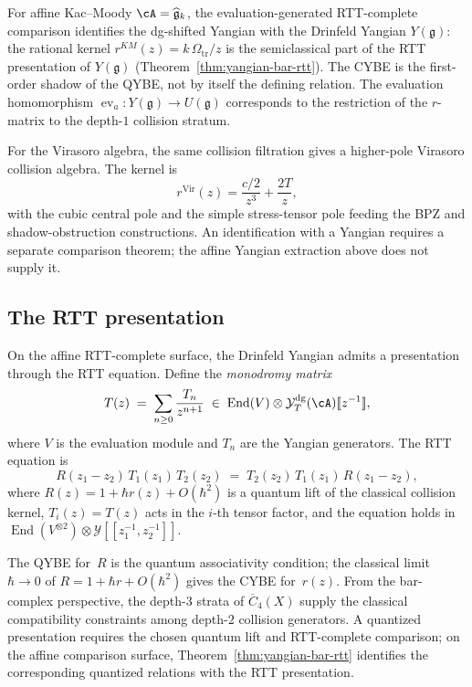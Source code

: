 For affine Kac--Moody $\cA = \widehat{\mathfrak{g}}_k$, the
evaluation-generated RTT-complete comparison identifies the
dg-shifted Yangian with the Drinfeld Yangian $Y(\mathfrak{g})$: the
rational kernel $r^{KM}(z) = k\,\Omega_{\mathrm{tr}}/z$ is the semiclassical part
of the RTT presentation of $Y(\mathfrak{g})$
(Theorem~\ref{thm:yangian-bar-rtt}). The CYBE is the first-order
shadow of the QYBE, not by itself the defining relation. The
evaluation homomorphism $\operatorname{ev}_a \colon Y(\mathfrak{g}) \to
U(\mathfrak{g})$ corresponds to the restriction of the $r$-matrix
to the depth-$1$ collision stratum.

For the Virasoro algebra, the same collision filtration gives a
higher-pole Virasoro collision algebra. The kernel is
\[
r^{\mathrm{Vir}}(z)
=
\frac{c/2}{z^3}+\frac{2T}{z},
\]
with the cubic central pole and the simple stress-tensor pole feeding
the BPZ and shadow-obstruction constructions. An identification with
a Yangian requires a separate comparison theorem; the affine Yangian
extraction above does not supply it.

\subsection{The RTT presentation}
\label{subsec:thqg-intro-rtt}

On the affine RTT-complete surface, the Drinfeld Yangian admits a
presentation through the RTT equation. Define the \emph{monodromy
matrix}
\begin{equation}\label{eq:thqg-intro-monodromy}
T(z) \;=\; \sum_{n \ge 0} \frac{T_n}{z^{n+1}}
\;\in\;
\operatorname{End}(V) \otimes \mathcal{Y}^{\mathrm{dg}}_T(\cA)[\![z^{-1}]\!],
\end{equation}
where $V$ is the evaluation module and $T_n$ are the Yangian generators.
The RTT equation is
\begin{equation}\label{eq:thqg-intro-rtt-equation}
R(z_1 - z_2)\,T_1(z_1)\,T_2(z_2)
\;=\;
T_2(z_2)\,T_1(z_1)\,R(z_1 - z_2),
\end{equation}
where $R(z) = 1 + \hbar r(z) + O(\hbar^2)$ is a quantum lift of the
classical collision kernel, $T_i(z) = T(z)$ acts in the $i$-th tensor
factor, and the equation holds in
$\operatorname{End}(V^{\otimes 2}) \otimes \mathcal{Y}[\![z_1^{-1}, z_2^{-1}]\!]$.

The QYBE for~$R$ is the quantum associativity condition; the classical
limit $\hbar \to 0$ of $R = 1 + \hbar r + O(\hbar^2)$ gives the CYBE
for~$r(z)$. From the bar-complex perspective, the depth-$3$ strata of
$\overline{C}_4(X)$ supply the classical compatibility constraints
among depth-$2$ collision generators. A quantized presentation requires
the chosen quantum lift and RTT-complete comparison; on the affine
comparison surface, Theorem~\ref{thm:yangian-bar-rtt} identifies the
corresponding quantized relations with the RTT presentation.

